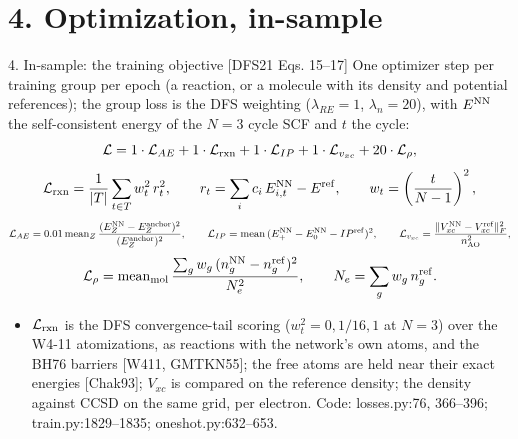 \section{4. Optimization, in-sample}

\begin{frame}{4. In-sample: the training objective [DFS21 Eqs. 15--17]}
  \small
  One optimizer step per training group per epoch (a reaction, or a molecule with its density and potential references); the group loss is the DFS weighting ($\lambda_{RE} = 1$, $\lambda_n = 20$), with $E^{\rm NN}$ the self-consistent energy of the $N = 3$ cycle SCF and $t$ the cycle:
  \[
  \mathcal{L} = 1\cdot\mathcal{L}_{AE} + 1\cdot\mathcal{L}_{\rm rxn} + 1\cdot\mathcal{L}_{IP} + 1\cdot\mathcal{L}_{v_{xc}} + 20\cdot\mathcal{L}_{\rho},
  \]
  \[
  \mathcal{L}_{\rm rxn} = \frac{1}{|T|}\sum_{t\in T} w_t^2\, r_t^2, \qquad
  r_t = \sum_i c_i\, E^{\rm NN}_{i,t} - E^{\rm ref}, \qquad
  w_t = \left(\frac{t}{N-1}\right)^2,
  \]
  \[
  \mathcal{L}_{AE} = 0.01\,\mathrm{mean}_Z\, \frac{(E_Z^{\rm NN} - E_Z^{\rm anchor})^2}{(E_Z^{\rm anchor})^2}, \qquad
  \mathcal{L}_{IP} = \mathrm{mean}\,(E^{\rm NN}_{+} - E^{\rm NN}_0 - IP^{\rm ref})^2, \qquad
  \mathcal{L}_{v_{xc}} = \frac{\|V_{xc}^{\rm NN} - V_{xc}^{\rm ref}\|_F^2}{n_{\rm AO}^2},
  \]
  \[
  \mathcal{L}_{\rho} = \mathrm{mean}_{\rm mol}\,\frac{\sum_g w_g\,(n^{\rm NN}_g - n^{\rm ref}_g)^2}{N_e^2}, \qquad N_e = \sum_g w_g\, n^{\rm ref}_g .
  \]
  \begin{itemize}
    \item $\mathcal{L}_{\rm rxn}$ is the DFS convergence-tail scoring ($w_t^2 = 0, 1/16, 1$ at $N = 3$) over the W4-11 atomizations, as reactions with the network's own atoms, and the BH76 barriers [W411, GMTKN55]; the free atoms are held near their exact energies [Chak93]; $V_{xc}$ is compared on the reference density; the density against CCSD on the same grid, per electron. Code: losses.py:76, 366--396; train.py:1829--1835; oneshot.py:632--653.
  \end{itemize}
\end{frame}
